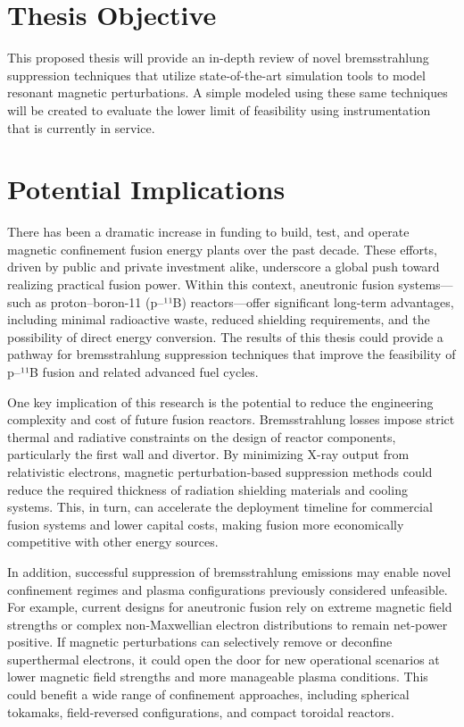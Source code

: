 \documentclass[12pt]{article}
\begin{document}
\section{Thesis Objective}
    This proposed thesis will provide an in-depth review of novel bremsstrahlung suppression techniques that utilize state-of-the-art simulation tools to model resonant magnetic perturbations. A simple modeled using these same techniques will be created to evaluate the lower limit of feasibility using instrumentation that is currently in service.

\section{Potential Implications}
    There has been a dramatic increase in funding to build, test, and operate magnetic confinement fusion energy plants over the past decade. These efforts, driven by public and private investment alike, underscore a global push toward realizing practical fusion power. Within this context, aneutronic fusion systems—such as proton–boron-11 (p–¹¹B) reactors—offer significant long-term advantages, including minimal radioactive waste, reduced shielding requirements, and the possibility of direct energy conversion. The results of this thesis could provide a pathway for bremsstrahlung suppression techniques that improve the feasibility of p–¹¹B fusion and related advanced fuel cycles.

    One key implication of this research is the potential to reduce the engineering complexity and cost of future fusion reactors. Bremsstrahlung losses impose strict thermal and radiative constraints on the design of reactor components, particularly the first wall and divertor. By minimizing X-ray output from relativistic electrons, magnetic perturbation-based suppression methods could reduce the required thickness of radiation shielding materials and cooling systems. This, in turn, can accelerate the deployment timeline for commercial fusion systems and lower capital costs, making fusion more economically competitive with other energy sources.

    In addition, successful suppression of bremsstrahlung emissions may enable novel confinement regimes and plasma configurations previously considered unfeasible. For example, current designs for aneutronic fusion rely on extreme magnetic field strengths or complex non-Maxwellian electron distributions to remain net-power positive. If magnetic perturbations can selectively remove or deconfine superthermal electrons, it could open the door for new operational scenarios at lower magnetic field strengths and more manageable plasma conditions. This could benefit a wide range of confinement approaches, including spherical tokamaks, field-reversed configurations, and compact toroidal reactors.
\end{document}
